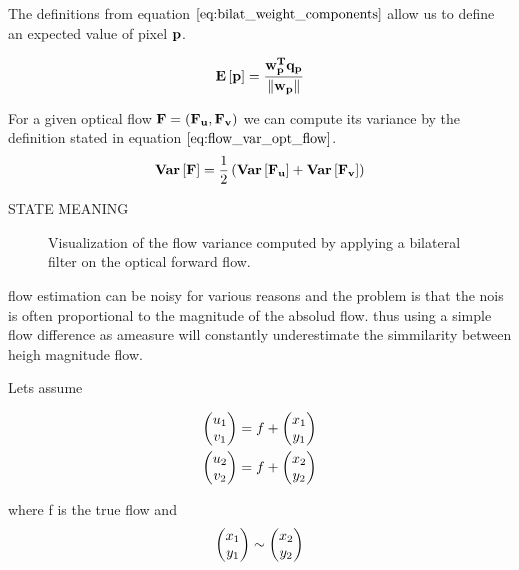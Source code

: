 The definitions from equation $\ref{eq:bilat_weight_components}$ allow us to define an expected value of pixel $\bf{p}$.

\begin{equation}
	\mathbf{E} \left[ \bf{p} \right] = \frac{\bf{w}_{p}^{T} \bf{q}_p}{\left\lVert\bf{w}_{p}\right\rVert}
\end{equation}

For a given optical flow $\bf{F} = (\bf{F_u}, \bf{F_v})$ we can compute its variance by the definition stated in equation $\ref{eq:flow_var_opt_flow}$.
\begin{equation}
	\mathbf{Var} \left[ \bf{F} \right] = \frac{1}{2} \left( \mathbf{Var} \left[ \bf{F_u} \right] + \mathbf{Var} \left[ \bf{F_v} \right] \right)
\label{eq:flow_var_opt_flow}	
\end{equation}

STATE MEANING

\begin{figure}[H]
\begin{center}
\end{center}
\caption[Flow Variance]{Visualization of the flow variance computed by applying a bilateral filter on the optical forward flow.}
\label{fig:flow_variance}
\end{figure}


flow estimation can be noisy for various reasons and the problem is that the nois is often proportional to the magnitude of the absolud flow. thus using a simple flow difference as ameasure will constantly underestimate the simmilarity between heigh magnitude flow. 

Lets assume 

\begin{equation}
\begin{aligned}
\colvec{u_1}{v_1} = f + \colvec{x_1}{y_1} \\
\colvec{u_2}{v_2} = f + \colvec{x_2}{y_2}
\end{aligned}
\label{eq:def_flow_tracking}	
\end{equation}

where f is the true flow and 
\begin{equation}
	\colvec{x_1}{y_1} \sim \colvec{x_2}{y_2}
\end{equation}

